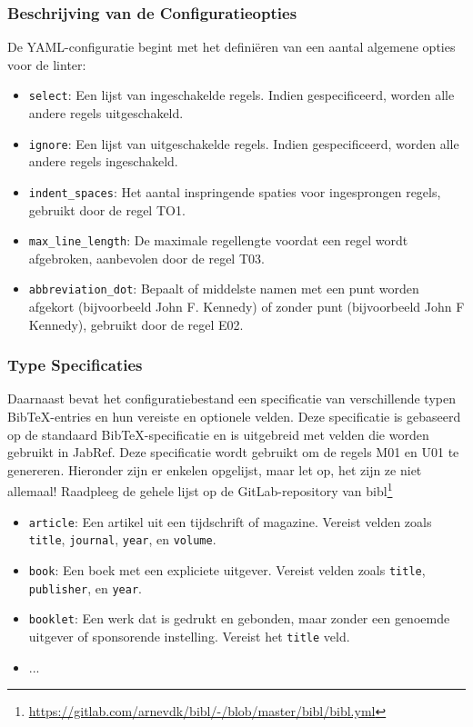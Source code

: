 \subsubsection{Beschrijving van de Configuratieopties}

De YAML-configuratie begint met het definiëren van een aantal algemene opties voor de linter:

\begin{itemize}
    \item \texttt{select}: Een lijst van ingeschakelde regels. Indien gespecificeerd, worden alle andere regels uitgeschakeld.
    \item \texttt{ignore}: Een lijst van uitgeschakelde regels. Indien gespecificeerd, worden alle andere regels ingeschakeld.
    \item \texttt{indent\_spaces}: Het aantal inspringende spaties voor ingesprongen regels, gebruikt door de regel TO1.
    \item \texttt{max\_line\_length}: De maximale regellengte voordat een regel wordt afgebroken, aanbevolen door de regel T03.
    \item \texttt{abbreviation\_dot}: Bepaalt of middelste namen met een punt worden afgekort (bijvoorbeeld John F. Kennedy) of zonder punt (bijvoorbeeld John F Kennedy), gebruikt door de regel E02.
\end{itemize}

\subsubsection{Type Specificaties}

Daarnaast bevat het configuratiebestand een specificatie van verschillende typen BibTeX-entries en hun vereiste en optionele velden. Deze specificatie is gebaseerd op de standaard BibTeX-specificatie en is uitgebreid met velden die worden gebruikt in JabRef. Deze specificatie wordt gebruikt om de regels M01 en U01 te genereren.
Hieronder zijn er enkelen opgelijst, maar let op, het zijn ze niet allemaal! Raadpleeg de gehele lijst op de GitLab-repository van bibl\footnote{\url{https://gitlab.com/arnevdk/bibl/-/blob/master/bibl/bibl.yml}}
\begin{itemize}
    \item \texttt{article}: Een artikel uit een tijdschrift of magazine. Vereist velden zoals \texttt{title}, \texttt{journal}, \texttt{year}, en \texttt{volume}.
    \item \texttt{book}: Een boek met een expliciete uitgever. Vereist velden zoals \texttt{title}, \texttt{publisher}, en \texttt{year}.
    \item \texttt{booklet}: Een werk dat is gedrukt en gebonden, maar zonder een genoemde uitgever of sponsorende instelling. Vereist het \texttt{title} veld.
    \item ...
\end{itemize}

